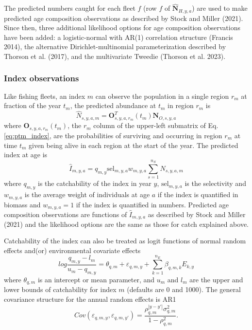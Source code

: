 \documentclass[
]{article}
\begin{document}
The predicted numbers caught for each fleet \(f\) (row \(f\) of \(\widehat{\mathbf{N}}_{H,y,a}\)) are used to make predicted age composition observations as described by Stock and Miller (2021). Since then, three additional likelihood options for age composition observations have been added: a logistic-normal with AR(1) correlation structure (Francis 2014), the alternative Dirichlet-multinomial parameterization described by Thorson et al. (2017), and the multivariate Tweedie (Thorson et al. 2023).

\hypertarget{index-observations}{%
\subsubsection*{Index observations}\label{index-observations}}

Like fishing fleets, an index \(m\) can observe the population in a single region \(r_m\) at fraction of the year \(t_m\), the predicted abundance at \(t_m\) in region \(r_m\) is
\[\widehat{N}_{s,y,a,m} = \mathbf{O}_{s,y,a,r_m}^T(t_m) \mathbf{N}_{O,s,y,a}\]
where \(\mathbf{O}_{s,y,a,r_m}(t_m)\), the \(r_m\) column of the upper-left submatrix of Eq. \ref{eq:ptm_index}, are the probabilities of surviving and occurring in region \(r_m\) at time \(t_m\) given being alive in each region at the start of the year. The predicted index at age is
\[\widehat{I}_{m,y,a} = q_{m,y} \text{sel}_{m,y,a}w_{m,y,a}\sum^{n_S}_{s = 1}\widehat{N}_{s,y,a,m}\]
where \(q_{m,y}\) is the catchability of the index in year \(y\), \(\text{sel}_{m,y,a}\) is the selectivity and \(w_{m,y,a}\) is the average weight of individuals at age \(a\) if the index is quantified in biomass and \(w_{m,y,a} = 1\) if the index is quantified in numbers. Predicted age composition observations are functions of \(\widehat{I}_{m,y,a}\) as described by Stock and Miller (2021) and the likelihood options are the same as those for catch explained above.

Catchability of the index can also be treated as logit functions of normal random effects and(or) environmental covariate effects
\[log \frac{q_{m,y}-l_m}{u_m-q_{m,y}} = \theta_{q,m} + \varepsilon_{q,m,y}  + \sum^{n_E}_{k=1} \beta_{q,m,k} E_{k,y}\]
where \(\theta_{q,m}\) is an intercept or mean parameter, and \(u_{m}\) and \(l_{m}\) are the upper and lower bounds of catchability for index \(m\) (defaults are 0 and 1000). The general covariance structure for the annual random effects is AR1
\[Cov\left(\varepsilon_{q,m,y},\varepsilon_{q,m,y'}\right) =   \frac{\rho_{q,m}^{|y-y'|}\sigma^2_{q,m}}{1 - \rho_{q,m}^2}.\]
\end{document}
